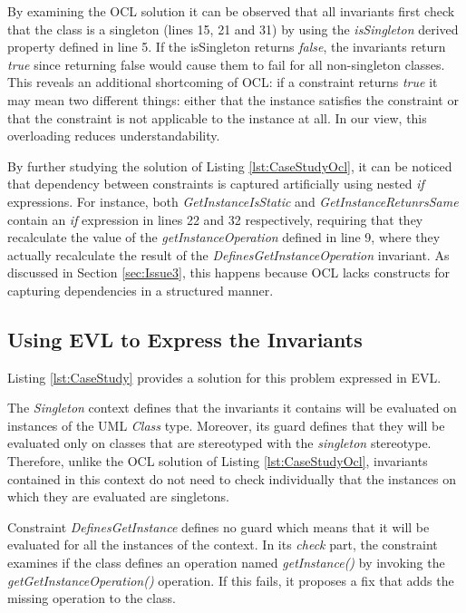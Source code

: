 

By examining the OCL solution it can be observed that all invariants first check that the class is a singleton (lines 15, 21 and 31) by using the \emph{isSingleton} derived property defined in line 5. If the isSingleton returns \emph{false}, the invariants return \emph{true} since returning false would cause them to fail for all non-singleton classes. This reveals an additional shortcoming of OCL: if a constraint returns \emph{true} it may mean two different things: either that the instance satisfies the constraint or that the constraint is not applicable to the instance at all. In our view, this overloading reduces understandability.

By further studying the solution of Listing \ref{lst:CaseStudyOcl}, it can be noticed that dependency between constraints is captured artificially using nested \emph{if} expressions. For instance, both \emph{GetInstanceIsStatic} and \emph{GetInstanceRetunrsSame} contain an \emph{if} expression in lines 22 and 32 respectively, requiring that they recalculate the value of the \emph{getInstanceOperation} defined in line 9, where they actually recalculate the result of the \emph{DefinesGetInstanceOperation} invariant. As discussed in Section \ref{sec:Issue3}, this happens because OCL lacks constructs for capturing dependencies in a structured manner.

\subsection{Using EVL to Express the Invariants}

Listing \ref{lst:CaseStudy} provides a solution for this problem expressed in EVL.



The \emph{Singleton} context defines that the invariants it contains will be evaluated on instances of the UML \emph{Class} type. Moreover, its guard defines that they will be evaluated only on classes that are stereotyped with the \emph{singleton} stereotype. Therefore, unlike the OCL solution of Listing \ref{lst:CaseStudyOcl}, invariants contained in this context do not need to check individually that the instances on which they are evaluated are singletons.

Constraint \emph{DefinesGetInstance} defines no guard which means that it will be evaluated for all the instances of the context. In its \emph{check} part, the constraint examines if the class defines an operation named \emph{getInstance()} by invoking the \emph{getGetInstanceOperation()} operation. If this fails, it proposes a fix that adds the missing operation to the class.

